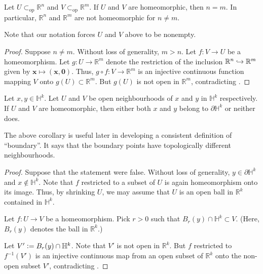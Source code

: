 \documentclass[12pt]{article}
\newcommand{\opsub}{\subset_{\operatorname{op}}}
\begin{document}
\begin{cor}
	Let $U \opsub \mathbb{R}^{n}$ and $V \opsub \mathbb{R}^{m}$. If $U$ and $V$ are homeomorphic, then $n = m$. In particular, $\mathbb{R}^{n}$ and $\mathbb{R}^{m}$ are not homeomorphic for $n \neq m$.
\end{cor}
Note that our notation forces $U$ and $V$ above to be nonempty.
\begin{proof} 
	Suppose $n \neq m$. Without loss of generality, $m > n$. Let $f : V \to U$ be a homeomorphism. Let $g : U \to \mathbb{R}^{m}$ denote the restriction of the inclusion $\mathbb{R}^{n} \hookrightarrow \mathbb{R}^{m}$ given by $\mathbf{x} \mapsto (\mathbf{x}, \mathbf{0})$. \newline
	Thus, $g \circ f : V \to \mathbb{R}^{m}$ is an injective continuous function mapping $V$ onto $g(U) \subset \mathbb{R}^{m}$. But $g(U)$ is not open in $\mathbb{R}^{m}$, contradicting .
\end{proof}

\begin{cor} \label{cor:boundary-Hk-intrinsic}
	Let $x, y \in \mathbb{H}^{k}$. Let $U$ and $V$ be open neighbourhoods of $x$ and $y$ in $\mathbb{H}^{k}$ respectively. If $U$ and $V$ are homeomorphic, then either both $x$ and $y$ belong to $\partial \mathbb{H}^{k}$ or neither does.
\end{cor}
The above corollary is useful later in developing a consistent definition of ``boundary''. It says that the boundary points have topologically different neighbourhoods.
\begin{proof} 
	Suppose that the statement were false. Without loss of generality, $y \in \partial \mathbb{H}^{k}$ and $x \notin \mathbb{H}^{k}$. Note that $f$ restricted to a subset of $U$ is again homeomorphism onto its image. Thus, by shrinking $U$, we may assume that $U$ is an open ball in $\mathbb{R}^{k}$ contained in $\mathbb{H}^{k}$. 

	Let $f : U \to V$ be a homeomorphism. Pick $r > 0$ such that $B_{r}(y) \cap \mathbb{H}^{k} \subset V$. (Here, $B_{r}(y)$ denotes the ball in $\mathbb{R}^{k}$.) 

	Let $V' \vcentcolon= B_{r}(y) \cap \mathbb{H}^{k}$. Note that $V'$ is not open in $\mathbb{R}^{k}$. But $f$ restricted to $f^{-1}(V')$ is an injective continuous map from an open subset of $\mathbb{R}^{k}$ onto the non-open subset $V'$, contradicting .
\end{proof}


\end{document}
